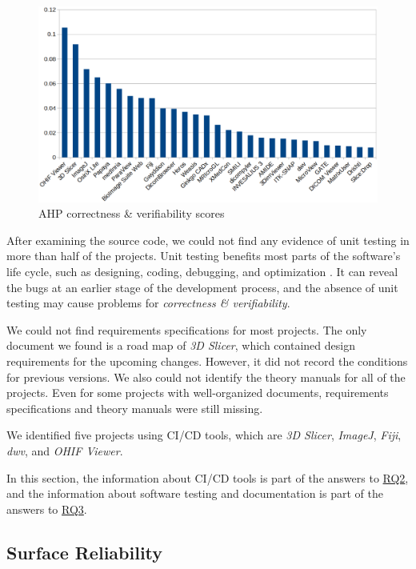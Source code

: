 \documentclass[preprint,12pt,authoryear]{elsarticle}
\begin{document}
\begin{figure}[ht]
\includegraphics[scale=0.38]{figures/correctness_verifiability_scores.png}
\caption{AHP correctness \& verifiability scores}
\label{fg_correctness_erifiability_scores}
\end{figure}

After examining the source code, we could not find any evidence of unit testing
in more than half of the projects. Unit testing benefits most parts of the
software's life cycle, such as designing, coding, debugging, and optimization
\citep{Hamill2004}. It can reveal the bugs at an earlier stage of the development
process, and the absence of unit testing may cause problems for
\textit{correctness \& verifiability}.

We could not find requirements specifications for most projects. The only
document we found is a road map of \textit{3D Slicer}, which contained design
requirements for the upcoming changes. However, it did not record the conditions
for previous versions. We also could not identify the theory manuals for all of
the projects. Even for some projects with well-organized documents, requirements
specifications and theory manuals were still missing.

We identified five projects using CI/CD tools, which are \textit{3D Slicer},
\textit{ImageJ}, \textit{Fiji}, \textit{dwv}, and \textit{OHIF Viewer}.

In this section, the information about CI/CD tools is part of the answers to
\hyperlink{rq2}{RQ2}, and the information about software testing and
documentation is part of the answers to \hyperlink{rq3}{RQ3}.

\subsection{Surface Reliability} \label{sec_result_reliability}
\end{document}
